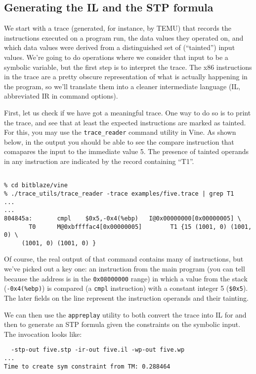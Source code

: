 \subsection {Generating the IL and the STP formula}

We start with a trace (generated, for instance, by TEMU) that records
the instructions executed on a program run, the data values they
operated on, and which data values were derived from a distinguished
set of (``tainted'') input values. We're going to do operations where
we consider that input to be a symbolic variable, but the first step
is to interpret the trace. The x86 instructions in the trace are a
pretty obscure representation of what is actually happening in the
program, so we'll translate them into a cleaner intermediate language
(IL, abbreviated IR in command options).

First, let us check if we have got a meaningful trace.  One way to do
so is to print the trace, and see that at least the expected
instructions are marked as tainted.  For this, you may use the
\texttt{trace\_reader} command utility in Vine. As shown below, in the
output you should be able to see the compare instruction
that comapares the input to the immediate value 5. The presence of
tainted operands in any instruction are indicated by the record
containing ``T1''.

\begin{Verbatim}[frame=lines, framesep=.5em]

% cd bitblaze/vine
% ./trace_utils/trace_reader -trace examples/five.trace | grep T1
...
...
804845a:       cmpl    $0x5,-0x4(%ebp)   I@0x00000000[0x00000005] \
       T0      M@0xbffffac4[0x00000005]        T1 {15 (1001, 0) (1001, 0) \
	 (1001, 0) (1001, 0) } 

\end{Verbatim}

Of course, the real output of that command contains many of
instructions, but we've picked out a key one: an instruction from the
main program (you can tell because the address is in the \verb'0x08000000'
range) in which a value from the stack (\verb'-0x4(%ebp)') is
compared (a \verb'cmpl' instruction) with a constant integer 5
(\verb'$0x5').%
The later fields on the line represent the instruction operands and
their tainting.

We can then use the \texttt{appreplay} utility to
both convert the trace into IL for and then to generate an STP formula
given the constraints on the symbolic input. The invocation looks
like:
\begin{Verbatim}[frame=lines, framesep=.5em]
% ./trace_utils/appreplay -trace examples/five.trace \
  -stp-out five.stp -ir-out five.il -wp-out five.wp
...
Time to create sym constraint from TM: 0.288464
\end{Verbatim}

